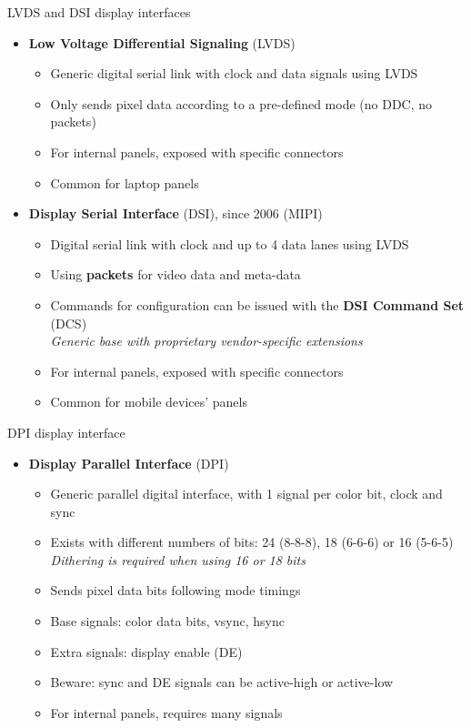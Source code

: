 \begin{frame}{LVDS and DSI display interfaces}


  \begin{itemize}
  \item \textbf{Low Voltage Differential Signaling} (LVDS)
    \begin{itemize}
    \item Generic digital serial link with clock and data signals using LVDS
    \item Only sends pixel data according to a pre-defined mode (no DDC, no packets)
    \item For internal panels, exposed with specific connectors
    \item Common for laptop panels
    \end{itemize}
  \item \textbf{Display Serial Interface} (DSI), since 2006 (MIPI)
    \begin{itemize}
    \item Digital serial link with clock and up to 4 data lanes using LVDS
    \item Using \textbf{packets} for video data and meta-data
    \item Commands for configuration can be issued with the \textbf{DSI Command Set} (DCS)\\
    \textit{Generic base with proprietary vendor-specific extensions}
    \item For internal panels, exposed with specific connectors
    \item Common for mobile devices' panels
    \end{itemize}
  \end{itemize}
\end{frame}

\begin{frame}{DPI display interface}
  \begin{itemize}
  \item \textbf{Display Parallel Interface} (DPI)
    \begin{itemize}
    \item Generic parallel digital interface, with 1 signal per color bit, clock and sync
    \item Exists with different numbers of bits: 24 (8-8-8), 18 (6-6-6) or 16 (5-6-5)\\
    \textit{Dithering is required when using 16 or 18 bits}
    \item Sends pixel data bits following mode timings
    \item Base signals: color data bits, vsync, hsync
    \item Extra signals: display enable (DE)
    \item Beware: sync and DE signals can be active-high or active-low
    \item For internal panels, requires many signals
    \end{itemize}
  \end{itemize}
\end{frame}

